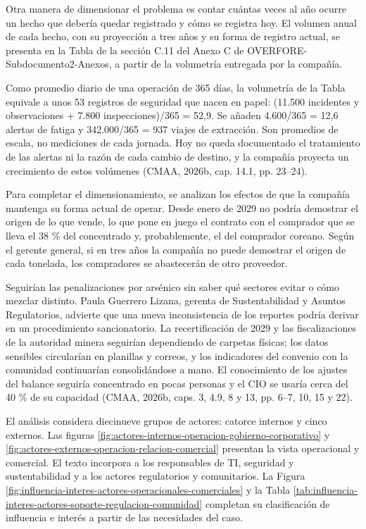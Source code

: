 \documentclass[subdoc]{../../comun/overfore}
\begin{document}
Otra manera de dimensionar el problema es contar cuántas veces al año ocurre un hecho que debería quedar registrado y cómo se registra hoy. El volumen anual de cada hecho, con su proyección a tres años y su forma de registro actual, se presenta en la Tabla  de la sección C.11 del Anexo C de OVERFORE-Subdocumento2-Anexos, a partir de la volumetría entregada por la compañía.

Como promedio diario de una operación de 365 días, la volumetría de la Tabla  equivale a unos 53 registros de seguridad que nacen en papel: (11.500 incidentes y observaciones + 7.800 inspecciones)/365 = 52,9. Se añaden 4.600/365 = 12,6 alertas de fatiga y 342.000/365 = 937 viajes de extracción. Son promedios de escala, no mediciones de cada jornada. Hoy no queda documentado el tratamiento de las alertas ni la razón de cada cambio de destino, y la compañía proyecta un crecimiento de estos volúmenes (CMAA, 2026b, cap. 14.1, pp. 23–24).

Para completar el dimensionamiento, se analizan los efectos de que la compañía mantenga su forma actual de operar. Desde enero de 2029 no podría demostrar el origen de lo que vende, lo que pone en juego el contrato con el comprador que se lleva el 38 \% del concentrado y, probablemente, el del comprador coreano. Según el gerente general, si en tres años la compañía no puede demostrar el origen de cada tonelada, los compradores se abastecerán de otro proveedor.

Seguirían las penalizaciones por arsénico sin saber qué sectores evitar o cómo mezclar distinto. Paula Guerrero Lizana, gerenta de Sustentabilidad y Asuntos Regulatorios, advierte que una nueva inconsistencia de los reportes podría derivar en un procedimiento sancionatorio. La recertificación de 2029 y las fiscalizaciones de la autoridad minera seguirían dependiendo de carpetas físicas; los datos sensibles circularían en planillas y correos, y los indicadores del convenio con la comunidad continuarían consolidándose a mano. El conocimiento de los ajustes del balance seguiría concentrado en pocas personas y el CIO se usaría cerca del 40 \% de su capacidad (CMAA, 2026b, caps. 3, 4.9, 8 y 13, pp. 6–7, 10, 15 y 22).

El análisis considera diecinueve grupos de actores: catorce internos y cinco externos. Las figuras \ref{fig:actores-internos-operacion-gobierno-corporativo} y \ref{fig:actores-externos-operacion-relacion-comercial} presentan la vista operacional y comercial. El texto incorpora a los responsables de TI, seguridad y sustentabilidad y a los actores regulatorios y comunitarios. La Figura \ref{fig:influencia-interes-actores-operacionales-comerciales} y la Tabla \ref{tab:influencia-interes-actores-soporte-regulacion-comunidad} completan su clasificación de influencia e interés a partir de las necesidades del caso.
\end{document}
